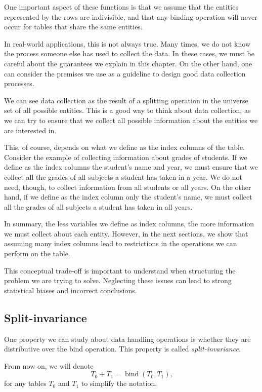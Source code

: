One important aspect of these functions is that we assume that the entities represented by
the rows are indivisible, and that any binding operation will never occur for tables that
share the same entities.

In real-world applications, this is not always true.  Many times, we do not know the
process someone else has used to collect the data.  In these cases, we must be careful
about the guarantees we explain in this chapter.  On the other hand, one can consider the
premises we use as a guideline to design good data collection processes.

We can see data collection as the result of a splitting operation in the universe set of
all possible entities.  This is a good way to think about data collection, as we can try
to ensure that we collect all possible information about the entities we are interested
in.

This, of course, depends on what we define as the index columns of the table.  Consider
the example of collecting information about grades of students.  If we define as the index
columns the student's name and year, we must ensure that we collect all the grades of all
subjects a student has taken in a year.  We do not need, though, to collect information
from all students or all years.  On the other hand, if we define as the index column only
the student's name, we must collect all the grades of all subjects a student has taken in
all years.

In summary, the less variables we define as index columns, the more information we must
collect about each entity.  However, in the next sections, we show that assuming many index columns
lead to restrictions in the operations we can perform on the table.

This conceptual trade-off is important to understand when structuring the problem we are
trying to solve.  Neglecting these issues can lead to strong statistical biases and
incorrect conclusions.

\subsection{Split-invariance}

One property we can study about data handling operations is whether they are distributive
over the bind operation.  This property is called \emph{split-invariance}.

From now on, we will denote \[
  T_0 + T_1 = \operatorname{bind}(T_0, T_1)\text{,}
\] for any tables $T_0$ and $T_1$ to simplify the notation.

